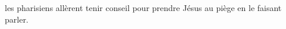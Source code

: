 \encetemps les pharisiens allèrent tenir conseil
	pour prendre Jésus au piège en le faisant parler.
